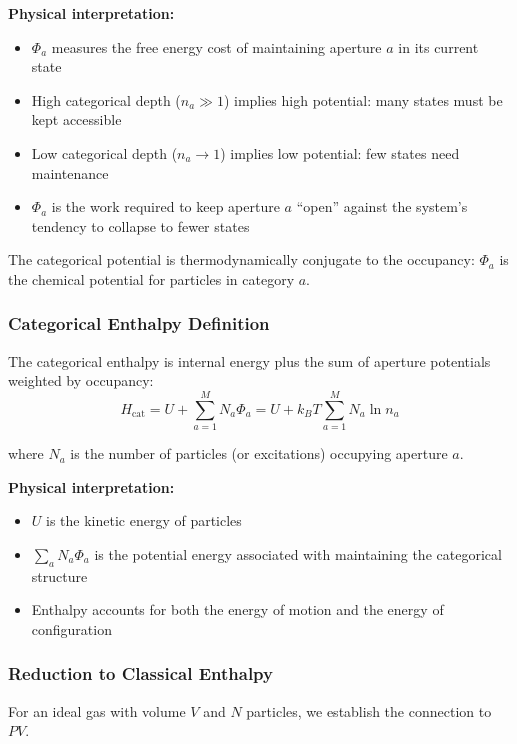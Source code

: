 \textbf{Physical interpretation:}
\begin{itemize}
\item $\Phi_a$ measures the free energy cost of maintaining aperture $a$ in its current state
\item High categorical depth ($n_a \gg 1$) implies high potential: many states must be kept accessible
\item Low categorical depth ($n_a \to 1$) implies low potential: few states need maintenance
\item $\Phi_a$ is the work required to keep aperture $a$ ``open'' against the system's tendency to collapse to fewer states
\end{itemize}

The categorical potential is thermodynamically conjugate to the occupancy: $\Phi_a$ is the chemical potential for particles in category $a$.

\subsubsection{Categorical Enthalpy Definition}

The categorical enthalpy is internal energy plus the sum of aperture potentials weighted by occupancy:
\begin{equation}
\boxed{H_{\text{cat}} = U + \sum_{a=1}^{M} N_a \Phi_a = U + k_B T \sum_{a=1}^{M} N_a \ln n_a}
\label{eq:categorical_enthalpy}
\end{equation}

where $N_a$ is the number of particles (or excitations) occupying aperture $a$.

\textbf{Physical interpretation:}
\begin{itemize}
\item $U$ is the kinetic energy of particles
\item $\sum_a N_a \Phi_a$ is the potential energy associated with maintaining the categorical structure
\item Enthalpy accounts for both the energy of motion and the energy of configuration
\end{itemize}

\subsubsection{Reduction to Classical Enthalpy}

For an ideal gas with volume $V$ and $N$ particles, we establish the connection to $PV$.

